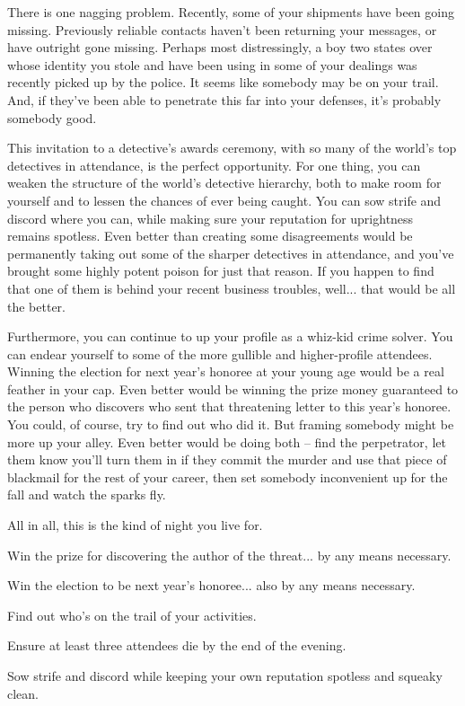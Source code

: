 \documentclass[char]{guildcamp4}
\begin{document}
There is one nagging problem. Recently, some of your shipments have been going missing. Previously reliable contacts haven't been returning your messages, or have outright gone missing. Perhaps most distressingly, a boy two states over whose identity you stole and have been using in some of your dealings was recently picked up by the police. It seems like somebody may be on your trail. And, if they've been able to penetrate this far into your defenses, it's probably somebody good.

This invitation to a detective's awards ceremony, with so many of the world's top detectives in attendance, is the perfect opportunity. For one thing, you can weaken the structure of the world's detective hierarchy, both to make room for yourself and to lessen the chances of ever being caught. You can sow strife and discord where you can, while making sure your reputation for uprightness remains spotless. Even better than creating some disagreements would be permanently taking out some of the sharper detectives in attendance, and you've brought some highly potent poison for just that reason. If you happen to find that one of them is behind your recent business troubles, well... that would be all the better.

Furthermore, you can continue to up your profile as a whiz-kid crime solver. You can endear yourself to some of the more gullible and higher-profile attendees. Winning the election for next year's honoree at your young age would be a real feather in your cap. Even better would be winning the prize money guaranteed to the person who discovers who sent that threatening letter to this year's honoree. You could, of course, try to find out who did it. But framing somebody might be more up your alley. Even better would be doing both -- find the perpetrator, let them know you'll turn them in if they commit the murder and use that piece of blackmail for the rest of your career, then set somebody inconvenient up for the fall and watch the sparks fly.

All in all, this is the kind of night you live for. 

\begin{itemz}[Goals]
	\item Win the prize for discovering the author of the threat... by any means necessary.
	\item Win the election to be next year's honoree... also by any means necessary.
	\item Find out who's on the trail of your activities.
	\item Ensure at least three attendees die by the end of the evening.
	\item Sow strife and discord while keeping your own reputation spotless and squeaky clean.
\end{itemz} 
\end{document}
